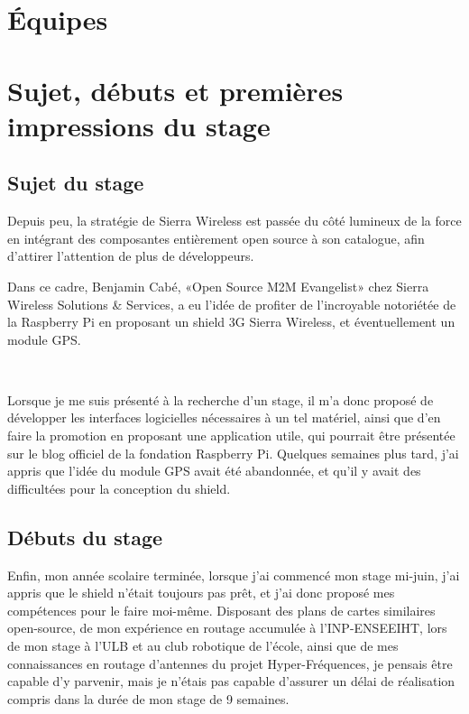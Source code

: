 \documentclass{article}
\begin{document}
\clearpage

\section{Équipes}

\clearpage

\section{Sujet, débuts et premières impressions du stage}
\subsection{Sujet du stage}

Depuis peu, la stratégie de Sierra Wireless est passée du côté lumineux de la force en intégrant des composantes entièrement open source à son catalogue, afin d’attirer l’attention de plus de développeurs.

Dans ce cadre, Benjamin Cabé, «Open Source M2M Evangelist» chez Sierra Wireless Solutions \& Services, a eu l’idée de profiter de l’incroyable notoriétée de la Raspberry Pi en proposant un shield 3G Sierra Wireless, et éventuellement un module GPS.

~

Lorsque je me suis présenté à la recherche d’un stage, il m’a donc proposé de développer les interfaces logicielles nécessaires à un tel matériel, ainsi que d’en faire la promotion en proposant une application utile, qui pourrait être présentée sur le blog officiel de la fondation Raspberry Pi. Quelques semaines plus tard, j’ai appris que l’idée du module GPS avait été abandonnée, et qu’il y avait des difficultées pour la conception du shield.

\subsection{Débuts du stage}

Enfin, mon année scolaire terminée, lorsque j’ai commencé mon stage mi-juin, j’ai appris que le shield n’était toujours pas prêt, et j’ai donc proposé mes compétences pour le faire moi-même. Disposant des plans de cartes similaires open-source, de mon expérience en routage accumulée à l’INP-ENSEEIHT, lors de mon stage à l’ULB et au club robotique de l’école, ainsi que de mes connaissances en routage d’antennes du projet Hyper-Fréquences, je pensais être capable d’y parvenir, mais je n’étais pas capable d’assurer un délai de réalisation compris dans la durée de mon stage de 9 semaines.
\end{document}
